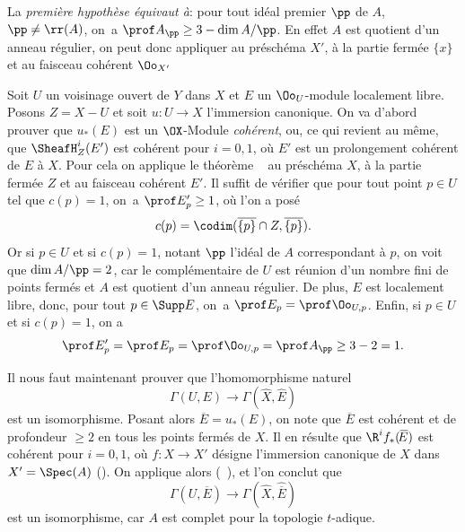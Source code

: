La \emph{premi\`ere hypoth\`ese \'equivaut \`a}: \og pour tout id\'eal premier $\pp$ de $A$, $\pp\neq \rr(A)$, on~a $\prof A_\pp\geq3-\dim A/\pp$\fg. En effet $A$ est quotient d'un anneau r\'egulier, on peut donc appliquer  au pr\'esch\'ema $X'$, \`a la partie ferm\'ee $\{x\}$ et au faisceau coh\'erent $\Oo_{X'}$

Soit $U$ un voisinage ouvert de $Y$ dans $X$ et $E$ un $\Oo_U$-module localement libre. Posons $Z=X-U$ et soit $u\colon U\to X$ l'immersion canonique. On va d'abord prouver que $u_\ast(E)$ est un $\OX$-Module \emph{coh\'erent}, ou, ce qui revient au m\^eme, que $\SheafH^i_Z(E')$ est coh\'erent pour $i=0, 1$, o\`u $E'$ est un prolongement coh\'erent de $E$ \`a $X$. Pour cela on applique le th\'eor\`eme ~ au pr\'esch\'ema $X$, \`a la partie ferm\'ee $Z$ et au faisceau coh\'erent $E'$. Il suffit de v\'erifier que pour tout point $p\in U$ tel que $c(p)=1$, on~a $\prof E'_p\geq 1$, o\`u l'on a pos\'e
\[
c(p)=\codim (\overline{\{p\}}\cap Z, \overline{\{p\}}).
\]
Or si $p\in U$ et si $c(p)=1$, notant $\pp$ l'id\'eal de $A$ correspondant \`a $p$, on voit que $\dim A/\pp=2$, car le compl\'ementaire de $U$ est r\'eunion d'un nombre fini de points ferm\'es et $A$ est quotient d'un anneau r\'egulier. De plus, $E$ est localement libre, donc, pour tout $p\in\Supp E$, on~a $\prof E_p=\prof\Oo_{U, p}$. Enfin, si $p\in U$ et si $c(p)=1$, on a
\[
\prof E'_p = \prof E_p = \prof\Oo_{U, p} = \prof A_\pp \geq 3-2=1.
\]

Il nous faut maintenant prouver que l'homomorphisme naturel
\begin{equation} \label{eq:X.1} {\Gamma(U, E) \to \Gamma(\hat{X}, \hat{E})}
\end{equation}
est un isomorphisme. Posant alors $\overline{\!E}=u_\ast(E)$, on note que $\overline{\!E}$ est coh\'erent et de profondeur $\geq 2$ en tous les points ferm\'es de $X$. Il en r\'esulte que $\R^i f_\ast(\overline{\!E})$ est coh\'erent pour $i=0, 1$, o\`u $f\colon X\to X'$ d\'esigne l'immersion canonique de $X$ dans $X'=\Spec(A)$ (\Exp {}). On applique alors (~), et l'on conclut que\pageoriginale
\begin{equation} \label{eq:X.2}
\Gamma(U, \overline{\!E}) \to \Gamma(\hat{X}, \widehat{\overline{\!E}})
\end{equation}
est un isomorphisme, car $A$ est complet pour la topologie $t$-adique.

